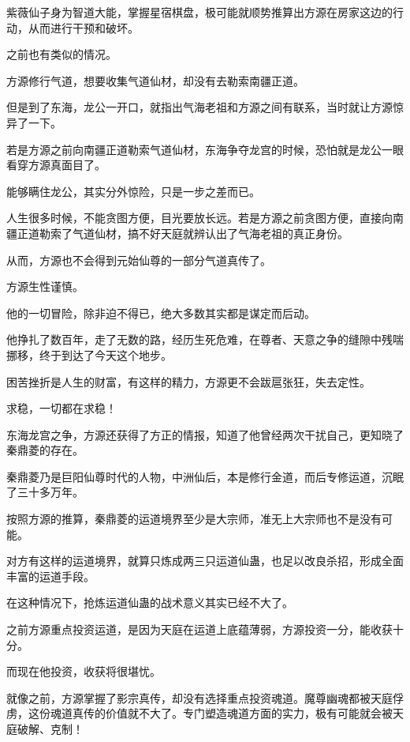 
\begin{this_body}



紫薇仙子身为智道大能，掌握星宿棋盘，极可能就顺势推算出方源在房家这边的行动，从而进行干预和破坏。

之前也有类似的情况。

方源修行气道，想要收集气道仙材，却没有去勒索南疆正道。

但是到了东海，龙公一开口，就指出气海老祖和方源之间有联系，当时就让方源惊异了一下。

若是方源之前向南疆正道勒索气道仙材，东海争夺龙宫的时候，恐怕就是龙公一眼看穿方源真面目了。

能够瞒住龙公，其实分外惊险，只是一步之差而已。

人生很多时候，不能贪图方便，目光要放长远。若是方源之前贪图方便，直接向南疆正道勒索了气道仙材，搞不好天庭就辨认出了气海老祖的真正身份。

从而，方源也不会得到元始仙尊的一部分气道真传了。

方源生性谨慎。

他的一切冒险，除非迫不得已，绝大多数其实都是谋定而后动。

他挣扎了数百年，走了无数的路，经历生死危难，在尊者、天意之争的缝隙中残喘挪移，终于到达了今天这个地步。

困苦挫折是人生的财富，有这样的精力，方源更不会跋扈张狂，失去定性。

求稳，一切都在求稳！

东海龙宫之争，方源还获得了方正的情报，知道了他曾经两次干扰自己，更知晓了秦鼎菱的存在。

秦鼎菱乃是巨阳仙尊时代的人物，中洲仙后，本是修行金道，而后专修运道，沉眠了三十多万年。

按照方源的推算，秦鼎菱的运道境界至少是大宗师，准无上大宗师也不是没有可能。

对方有这样的运道境界，就算只炼成两三只运道仙蛊，也足以改良杀招，形成全面丰富的运道手段。

在这种情况下，抢炼运道仙蛊的战术意义其实已经不大了。

之前方源重点投资运道，是因为天庭在运道上底蕴薄弱，方源投资一分，能收获十分。

而现在他投资，收获将很堪忧。

就像之前，方源掌握了影宗真传，却没有选择重点投资魂道。魔尊幽魂都被天庭俘虏，这份魂道真传的价值就不大了。专门塑造魂道方面的实力，极有可能就会被天庭破解、克制！


\end{this_body}
